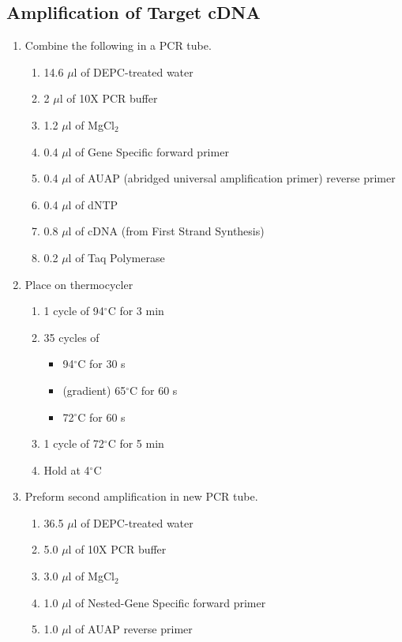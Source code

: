 \subsection{Amplification of Target cDNA}
\begin{enumerate}
\item Combine the following in a PCR tube.
  \begin{enumerate}
  \item 14.6 $\mu$l of DEPC-treated water
  \item 2 $\mu$l of 10X PCR buffer
  \item 1.2 $\mu$l of MgCl$_2$
  \item 0.4 $\mu$l of Gene Specific forward primer
  \item 0.4 $\mu$l of AUAP (abridged universal amplification primer) reverse primer
  \item 0.4 $\mu$l of dNTP
  \item 0.8 $\mu$l of cDNA (from First Strand Synthesis)
  \item 0.2 $\mu$l of Taq Polymerase
  \end{enumerate}
\item Place on thermocycler\footnotemark {}
  \begin{enumerate}
  \item 1 cycle of 94$^{\circ}$C for 3 min
  \item 35 cycles of
    \begin{itemize}
    \item 94$^{\circ}$C for 30 s
    \item (gradient) 65$^{\circ}$C for 60 s
    \item 72$^{\circ}$C for 60 s
    \end{itemize}
  \item 1 cycle of 72$^{\circ}$C for 5 min
  \item Hold at 4$^{\circ}$C
  \end{enumerate}
\item Preform second amplification in new PCR tube.
  \begin{enumerate}
  \item 36.5 $\mu$l of DEPC-treated water
  \item 5.0 $\mu$l of 10X PCR buffer
  \item 3.0 $\mu$l of MgCl$_2$
  \item 1.0 $\mu$l of Nested-Gene Specific forward primer
  \item 1.0 $\mu$l of AUAP reverse primer

\end{enumerate}
\end{enumerate}
